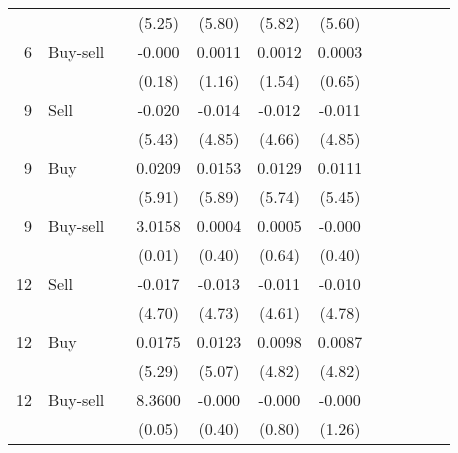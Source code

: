 \documentclass[aspectratio=169]{beamer}
\begin{document}
\begin{frame}
\begin{center}
{\begin{tabular}{rlcccccccccc}
				      &          &                             & (5.25)                      & (5.80) & (5.82) & (5.60) &    &   &        &        &        \\
				6     & Buy-sell &                             & -0.000                      & 0.0011 & 0.0012 & 0.0003 &    &   &        &        &        \\[1ex]
				      &          &                             & (0.18)                      & (1.16) & (1.54) & (0.65) &    &   &        &        &        \\
				9     & Sell     &                             & -0.020                      & -0.014 & -0.012 & -0.011 &    &   &        &        &        \\[1ex]
				      &          &                             & (5.43)                      & (4.85) & (4.66) & (4.85) &    &   &        &        &        \\
				9     & Buy      &                             & 0.0209                      & 0.0153 & 0.0129 & 0.0111 &    &   &        &        &        \\[1ex]
				      &          &                             & (5.91)                      & (5.89) & (5.74) & (5.45) &    &   &        &        &        \\
				9     & Buy-sell &                             & 3.0158                      & 0.0004 & 0.0005 & -0.000 &    &   &        &        &        \\[1ex]
				      &          &                             & (0.01)                      & (0.40) & (0.64) & (0.40) &    &   &        &        &        \\
				12    & Sell     &                             & -0.017                      & -0.013 & -0.011 & -0.010 &    &   &        &        &        \\[1ex]
				      &          &                             & (4.70)                      & (4.73) & (4.61) & (4.78) &    &   &        &        &        \\
				12    & Buy      &                             & 0.0175                      & 0.0123 & 0.0098 & 0.0087 &    &   &        &        &        \\[1ex]
				      &          &                             & (5.29)                      & (5.07) & (4.82) & (4.82) &    &   &        &        &        \\
				12    & Buy-sell &                             & 8.3600                      & -0.000 & -0.000 & -0.000 &    &   &        &        &        \\[1ex]
				      &          &                             & (0.05)                      & (0.40) & (0.80) & (1.26) &    &   &        &        &
			\end{tabular}}
	\end{center}
\end{frame}
\end{document}
